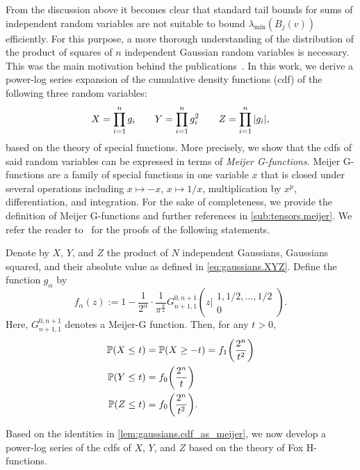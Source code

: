 From the discussion above it becomes clear that standard tail bounds for sums of independent random variables are not suitable to bound $\lambda_\mathrm{min}(B_j(v))$ efficiently.
For this purpose, a more thorough understanding of the distribution of the product of squares of $n$ independent Gaussian random variables is necessary.
This was the main motivation behind the publications~\cite{Stojanac_2017_Ona,Stojanac_2017_On}.
In this work, we derive a power-log series expansion of the cumulative density functions (cdf) of the following three random variables:
\[
  \label{eq:gaussians.XYZ}
  X = \prod_{i=1}^n g_i \quad\quad
  Y = \prod_{i=1}^n g_i^2 \quad\quad
  Z = \prod_{i=1}^n {\left\vert g_i\right\vert},
\]
based on the theory of special functions.
More precisely, we show that the cdfs of said random variables can be expressed in terms of \emph{Meijer G-functions}.
Meijer G-functions are a family of special functions in one variable $x$ that is closed under several operations including $x \mapsto -x$, $x \mapsto 1/x$, multiplication by $x^p$, differentiation, and integration.
For the sake of completeness, we provide the definition of Meijer G-functions and further references in \cref{sub:tensors.meijer}.
We refer the reader to~\cite{Stojanac_2017_On} for the proofs of the following statements.

\begin{lemma}%
  \label{lem:gaussians.cdf_as_meijer}
  Denote by $X$, $Y$, and $Z$ the product of $N$ independent Gaussians, Gaussians squared, and their absolute value as defined in \cref{eq:gaussians.XYZ}.
  Define the function $g_{\alpha}$ by
  \[\label{eq:gaussians.f_alpha}
    f_{\alpha}(z)
    :=
    1 - \frac{1}{2^{\alpha}} \cdot \frac{1}{\pi^{\frac{n}{2}}}    G_{n+1, 1}^{0,n+1} \left(z \Big|  \begin{matrix} 1,1/2,\ldots,1/2 \\ 0 \end{matrix} \right).
  \]
  Here, $G_{n+1, 1}^{0,n+1}$ denotes a Meijer-G function.
  Then, for any $t> 0$,
  \begin{align}
    \mathbb{P}{\left(X \leq t\right)}&= \mathbb{P}{\left(X \geq -t\right)}  = f_{1}{\left(\frac{2^n}{t^2}\right)} \\
    \mathbb{P}{\left(Y \leq t\right)} &=  f_{0}{\left(\frac{2^n}{t}\right)} \\
    \mathbb{P}{\left(Z \leq t\right)} &= f_{0}{\left(\frac{2^n}{t^2}\right)}.
  \end{align}
\end{lemma}

Based on the identities in \cref{lem:gaussians.cdf_as_meijer}, we now develop a power-log series of the cdfs of $X$, $Y$, and $Z$ based on the theory of Fox H-functions.

